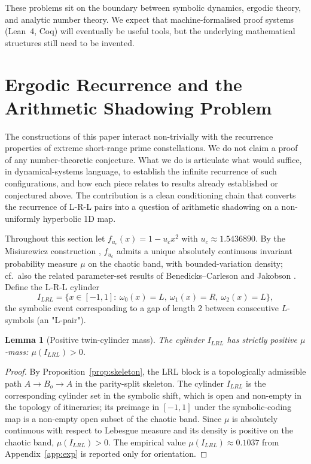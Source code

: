 \documentclass{iopjournal}
\newtheorem{lemma}{Lemma}
\theoremstyle{definition}
\begin{document}
These problems sit on the boundary between symbolic dynamics, ergodic
theory, and analytic number theory. We expect that machine-formalised
proof systems (Lean~4, Coq) will eventually be useful tools, but the
underlying mathematical structures still need to be invented.

\section{Ergodic Recurrence and the Arithmetic Shadowing Problem}
\label{sec:twin-pathway}

The constructions of this paper interact non-trivially with the
recurrence properties of extreme short-range prime constellations.
We do not claim a proof of any number-theoretic conjecture. What we
do is articulate what would suffice, in dynamical-systems language,
to establish the infinite recurrence of such configurations, and how
each piece relates to results already established or conjectured
above. The contribution is a clean conditioning chain that converts
the recurrence of L-R-L pairs into a question of arithmetic
shadowing on a non-uniformly hyperbolic 1D map.

Throughout this section let $f_{u_c}(x) = 1 - u_c x^2$ with
$u_c \approx 1.5436890$. By the Misiurewicz construction
\cite{misiurewicz1981absolutely}, $f_{u_c}$ admits a unique absolutely
continuous invariant probability measure $\mu$ on the chaotic band,
with bounded-variation density; cf.\ also the related parameter-set
results of Benedicks--Carleson \cite{benedicks1985dynamics} and
Jakobson \cite{jakobson1981absolutely}. Define the L-R-L cylinder
\[
    I_{LRL} = \{ x \in [-1, 1] :\
        \omega_0(x) = L,\ \omega_1(x) = R,\ \omega_2(x) = L \},
\]
the symbolic event corresponding to a gap of length $2$ between
consecutive $L$-symbols (an "L-pair").

\begin{lemma}[Positive twin-cylinder mass]
\label{lem:positive-mass}
The cylinder $I_{LRL}$ has strictly positive $\mu$-mass:
$\mu(I_{LRL}) > 0$.
\end{lemma}
\begin{proof}
By Proposition~\ref{prop:skeleton}, the LRL block is a topologically
admissible path $A \to B_o \to A$ in the parity-split skeleton. The
cylinder $I_{LRL}$ is the corresponding cylinder set in the symbolic
shift, which is open and non-empty in the topology of itineraries; its
preimage in $[-1, 1]$ under the symbolic-coding map is a non-empty
open subset of the chaotic band. Since $\mu$ is absolutely continuous
with respect to Lebesgue measure
\cite{misiurewicz1981absolutely,jakobson1981absolutely} and its density
is positive on the chaotic band, $\mu(I_{LRL}) > 0$. The empirical
value $\mu(I_{LRL}) \approx 0.1037$ from
Appendix~\ref{app:exp} is reported only for orientation.
\end{proof}
\end{document}

